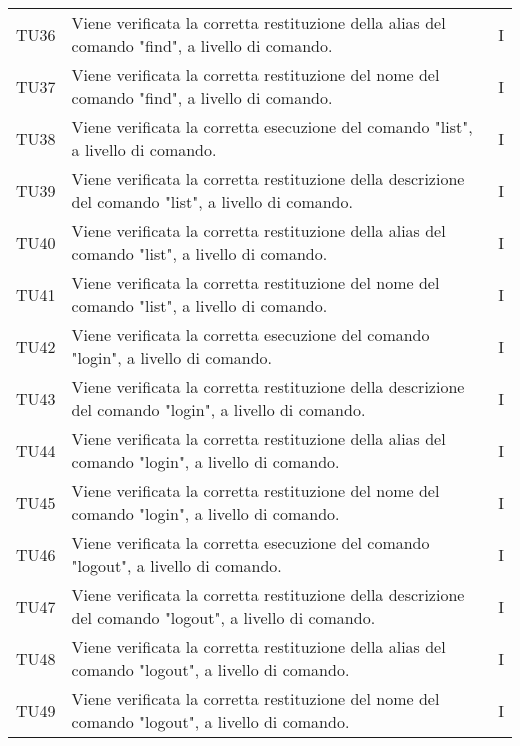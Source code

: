\begin{longtable}{|C{1.5cm}|C{10cm}|C{1.5cm}|}
	TU36 &
	Viene verificata la corretta restituzione della alias del comando "find", a livello di comando.  &
	I \\
	
	TU37 &
	Viene verificata la corretta restituzione del nome del comando "find", a livello di comando.  &
	I \\
	
	TU38 &
	Viene verificata la corretta esecuzione del comando "list", a livello di comando.  &
	I \\
	
	TU39 &
	Viene verificata la corretta restituzione della descrizione del comando "list", a livello di comando.  &
	I \\
	
	TU40 &
	Viene verificata la corretta restituzione della alias del comando "list", a livello di comando.  &
	I \\
	
	TU41 &
	Viene verificata la corretta restituzione del nome del comando "list", a livello di comando.  &
	I \\
	
	TU42 &
	Viene verificata la corretta esecuzione del comando "login", a livello di comando.  &
	I \\
	
	TU43 &
	Viene verificata la corretta restituzione della descrizione del comando "login", a livello di comando.  &
	I \\
	
	TU44 &
	Viene verificata la corretta restituzione della alias del comando "login", a livello di comando.  &
	I \\
	
	TU45 &
	Viene verificata la corretta restituzione del nome del comando "login", a livello di comando.  &
	I \\
	
	TU46 &
	Viene verificata la corretta esecuzione del comando "logout", a livello di comando.  &
	I \\
	
	TU47 &
	Viene verificata la corretta restituzione della descrizione del comando "logout", a livello di comando.  &
	I \\
	
	TU48 &
	Viene verificata la corretta restituzione della alias del comando "logout", a livello di comando.  &
	I \\
	
	TU49 &
	Viene verificata la corretta restituzione del nome del comando "logout", a livello di comando.  &
	I \\
	

\end{longtable}
